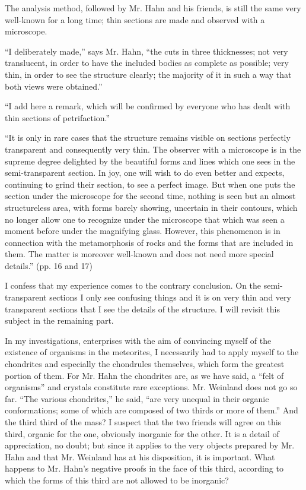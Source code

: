 \documentclass[a4paper, 12pt, oneside]{article}
\begin{document}
The analysis method, followed by Mr. Hahn and his friends, is still the same very well-known for a long time; thin sections are made and observed with a microscope.

``I deliberately made,'' says Mr. Hahn, ``the cuts in three thicknesses; not very translucent, in order to have the included bodies as complete as possible; very thin, in order to see the structure clearly; the majority of it in such a way that both views were obtained.''

``I add here a remark, which will be confirmed by everyone who has dealt with thin sections of petrifaction.''

``It is only in rare cases that the structure remains visible on sections perfectly transparent and consequently very thin. The observer with a microscope is in the supreme degree delighted by the beautiful forms and lines which one sees in the semi-transparent section. In joy, one will wish to do even better and expects, continuing to grind their section, to see a perfect image. But when one puts the section under the microscope for the second time, nothing is seen but an almost structureless area, with forms barely showing, uncertain in their contours, which no longer allow one to recognize under the microscope that which was seen a moment before under the magnifying glass. However, this phenomenon is in connection with the metamorphosis of rocks and the forms that are included in them. The matter is moreover well-known and does not need more special details.'' (pp. 16 and 17)

I confess that my experience comes to the contrary conclusion. On the semi-transparent sections I only see confusing things and it is on very thin and very transparent sections that I see the details of the structure. I will revisit this subject in the remaining part.

In my investigations, enterprises with the aim of convincing myself of the existence of organisms in the meteorites, I necessarily had to apply myself to the chondrites and especially the chondrules themselves, which form the greatest portion of them. For Mr. Hahn the chondrites are, as we have said, a ``felt of organisms'' and crystals constitute rare exceptions. Mr. Weinland does not go so far. ``The various chondrites,'' he said, ``are very unequal in their organic conformations; some of which are composed of two thirds or more of them.'' And the third third of the mass? I suspect that the two friends will agree on this third, organic for the one, obviously inorganic for the other. It is a detail of appreciation, no doubt; but since it applies to the very objects prepared by Mr. Hahn and that Mr. Weinland has at his disposition, it is important. What happens to Mr. Hahn's negative proofs in the face of this third, according to which the forms of this third are not allowed to be inorganic?
\end{document}
